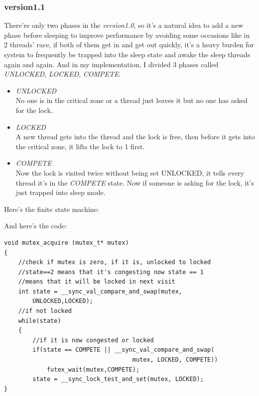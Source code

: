 \documentclass{article}
\begin{document}
		\subsubsection{\textbf{version1.1}}
		There're only two phases in the \emph{version1.0}, so it's a natural idea to add a new phase before sleeping to improve performance by avoiding some occasions like in 2 threads' race, if both of them get in and get out quickly, it's a heavy burden for system to frequently be trapped into the sleep state and awake the sleep threads again and again. And in my implementation, I divided 3 phases called \textit{UNLOCKED}, \textit{LOCKED}, \textit{COMPETE}. \\
		\begin{itemize}
			\item \textit{UNLOCKED} \\
				No one is in the critical zone or a thread just leaves it but no one has asked for the lock. \\
			\item \textit{LOCKED} \\
				A new thread gets into the thread and the lock is free, then before it gets into the critical zone, it lifts the lock to 1 first. \\
			\item \textit{COMPETE} \\
				Now the lock is visited twice without being set UNLOCKED, it tells every thread it's in the \textit{COMPETE} state. Now if someone is asking for the lock, it's just trapped into sleep mode. \\
		\end{itemize}
		Here's the finite state machine: \\
		\begin{center}
		\end{center}
		And here's the code: \\
		\begin{lstlisting}
void mutex_acquire (mutex_t* mutex)
{
	//check if mutex is zero, if it is, unlocked to locked
	//state==2 means that it's congesting now state == 1 
	//means that it will be locked in next visit
	int state = __sync_val_compare_and_swap(mutex,
		UNLOCKED,LOCKED);
	//if not locked 
	while(state)
	{
		//if it is now congested or locked
		if(state == COMPETE || __sync_val_compare_and_swap(
		                            mutex, LOCKED, COMPETE))
			futex_wait(mutex,COMPETE);
		state = __sync_lock_test_and_set(mutex, LOCKED);
}
		\end{lstlisting}
\end{document}
